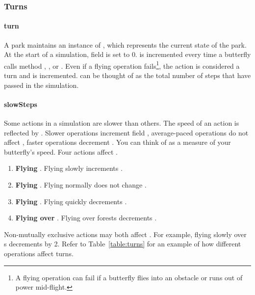 \documentclass{pset}
\begin{document}
\subsubsection{Turns}
\paragraph{turn}
A park maintains an instance of , which represents the current
state of the park. At the start of a simulation, field  is
set to 0.  is incremented every time a butterfly calls method
, , or . Even if a flying operation
fails\footnote{A flying operation can fail if a butterfly flies into an
obstacle or runs out of power mid-flight.}, the action is considered a turn
and  is incremented.  can be thought of as the total
number of steps that have passed in the simulation. 

\paragraph{slowSteps}
Some actions in a simulation are slower than others. The speed of an action is
reflected by . Slower operations increment field
, average-paced operations do not affect ,
faster operations decrement . You can think of 
as a measure of your butterfly's speed.  Four actions  affect .
\begin{enumerate}
    \item \textbf{Flying }. Flying slowly increments
        .
    \item \textbf{Flying }. Flying normally does not change
        .
    \item \textbf{Flying }. Flying quickly decrements
        .
    \item \textbf{Flying over }. Flying over forests decrements
        .
\end{enumerate}

Non-mutually exclusive actions may both affect . For example,
flying slowly over s decrements  by 2. Refer to
Table~\ref{table:turns} for an example of how different operations affect
turns.
\end{document}

